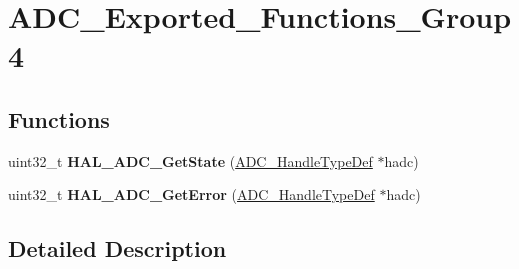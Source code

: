 \hypertarget{group___a_d_c___exported___functions___group4}{}\section{A\+D\+C\+\_\+\+Exported\+\_\+\+Functions\+\_\+\+Group4}
\label{group___a_d_c___exported___functions___group4}
\subsection*{Functions}
\begin{DoxyCompactItemize}
\item 
\mbox{\label{group___a_d_c___exported___functions___group4_ga894143f0fa1502ac0afa6eae8fdaadcc}} 
uint32\+\_\+t {\bfseries H\+A\+L\+\_\+\+A\+D\+C\+\_\+\+Get\+State} (\hyperlink{struct_a_d_c___handle_type_def}{A\+D\+C\+\_\+\+Handle\+Type\+Def} $\ast$hadc)
\item 
\mbox{\label{group___a_d_c___exported___functions___group4_ga3a546afb96f473f266573783f37ee8af}} 
uint32\+\_\+t {\bfseries H\+A\+L\+\_\+\+A\+D\+C\+\_\+\+Get\+Error} (\hyperlink{struct_a_d_c___handle_type_def}{A\+D\+C\+\_\+\+Handle\+Type\+Def} $\ast$hadc)
\end{DoxyCompactItemize}


\subsection{Detailed Description}

